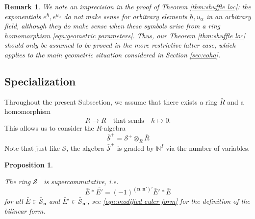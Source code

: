 \documentclass{amsart}
\newtheorem{proposition}[theorem]{Proposition}
\newtheorem{remark}[theorem]{Remark}
\def\CS{{\mathcal{S}}}
\def\nn{{\mathbb{N}^I}}
\def\bn{{\boldsymbol{n}}}
\def\ring{R}
\begin{document}
\medskip 

\begin{remark} We note an imprecision in the proof of Theorem \ref{thm:shuffle loc}: the exponentials $e^{\hbar}, e^{u_\alpha}$ do not make sense for arbitrary elements $\hbar,u_\alpha$ in an arbitrary field, although they do make sense when these symbols arise from a ring homomorphism \eqref{eqn:geometric parameters}. Thus, our Theorem \ref{thm:shuffle loc} should only be assumed to be proved in the more restrictive latter case, which applies to the main geometric situation considered in Section \ref{sec:coha}.

\end{remark}

\medskip 

\subsection{Specialization}
\label{sub:specialization}

Throughout the present Subsection, we assume that there exists a ring $\bar{\ring}$ and a homomorphism
$$
\ring \rightarrow \bar{\ring} \quad \text{that sends} \quad \hbar \mapsto 0.
$$
This allows us to consider the $\bar{\ring}$-algebra
$$
\bar{\CS}^+ = \CS^+ \otimes_{\ring} \bar{\ring}
$$
Note that just like $\CS$, the algebra $\bar{\CS}^+$ is graded by $\nn$ via the number of variables.

\medskip 

\begin{proposition}
\label{prop:spec is comm}

The ring $\bar{\CS}^+$ is supercommutative, i.e.
$$
\bar{E} * \bar{E'} = (-1)^{(\bn,\bn')'}\bar{E}' * \bar{E}
$$
for all $\bar{E} \in \bar{\CS}_{\bn}$ and $\bar{E}' \in \bar{\CS}_{\bn'}$, see \eqref{eqn:modified euler form} for the definition of the bilinear form.

\end{proposition}

\medskip 
\end{document}
